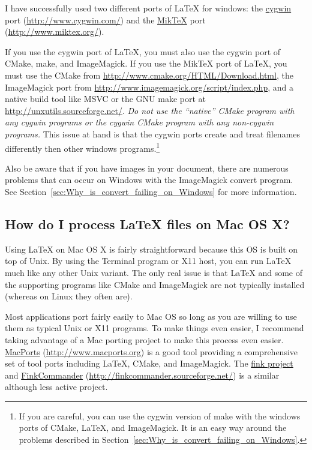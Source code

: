 \documentclass{article}
\newcommand*{\textfile}[1]{\textsf{#1}}
\newcommand*{\textprog}[1]{\textfile{#1}}
\newcommand*{\latex}{\LaTeX\xspace}
\newcommand*{\miktex}{Mik\TeX\xspace}
\begin{document}
  I have successfully used two different ports of LaTeX for windows: the
  \href{http://www.cygwin.com/}{cygwin} port
  (\href{http://www.cygwin.com/}{http://www.cygwin.com/}) and the
  \href{http://www.miktex.org/}{\miktex} port
  (\href{http://www.miktex.org/}{http://www.miktex.org/}).

  If you use the cygwin port of \latex, you must also use the cygwin port
  of CMake, make, and ImageMagick. If you use the \miktex port of \latex,
  you must use the CMake from
  \href{http://www.cmake.org/HTML/Download.html}{http://www.cmake.org/HTML/Download.html},
  the ImageMagick port from
  \href{http://www.imagemagick.org/script/index.php}{http://www.imagemagick.org/script/index.php},
  and a native build tool like MSVC or the GNU make port at
  \href{http://unxutils.sourceforge.net/}{http://unxutils.sourceforge.net/}.
  \emph{Do not use the ``native'' CMake program with any cygwin programs or
  the cygwin CMake program with any non-cygwin programs.} This issue at
  hand is that the cygwin ports create and treat filenames differently then
  other windows programs.\footnote{If you are careful, you can use the
  cygwin version of make with the windows ports of CMake, \latex, and
  ImageMagick.  It is an easy way around the problems described in
  Section~\ref{sec:Why_is_convert_failing_on_Windows}.}

  Also be aware that if you have images in your document, there are
  numerous problems that can occur on Windows with the ImageMagick
  \textprog{convert} program. See
  Section~\ref{sec:Why_is_convert_failing_on_Windows} for more information.

  \subsection{How do I process \latex files on Mac OS X?}
  \label{sec:How_do_I_process_latex_files_on_Mac_OS_X}

  Using \latex on Mac OS X is fairly straightforward because this OS is
  built on top of Unix.  By using the Terminal program or X11 host, you can
  run \latex much like any other Unix variant.  The only real issue is that
  \latex and some of the supporting programs like CMake and ImageMagick are
  not typically installed (whereas on Linux they often are).

  Most applications port fairly easily to Mac OS so long as you are willing
  to use them as typical Unix or X11 programs.  To make things even easier,
  I recommend taking advantage of a Mac porting project to make this
  process even easier.  \href{http://www.macports.org}{MacPorts}
  (\href{http://www.macports.org}{http://www.macports.org}) is a good tool
  providing a comprehensive set of tool ports including \latex, CMake, and
  ImageMagick.  The \href{http://www.finkproject.org/}{fink project} and
  \href{http://finkcommander.sourceforge.net/}{FinkCommander}
  (\href{http://finkcommander.sourceforge.net/}{http://finkcommander.sourceforge.net/})
  is a similar although less active project.
\end{document}
